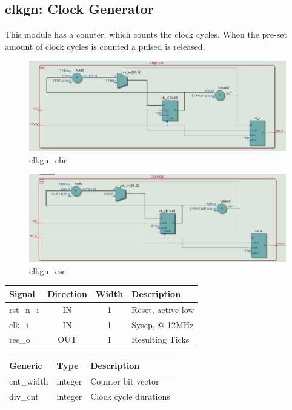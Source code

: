 \documentclass[12pt,a4 paper] {report}
\begin{document}
\subsection{clkgn: Clock Generator}
This module has a counter, which counts the clock cycles. When the pre-set amount of clock cycles is counted a pulsed 
is released.
\begin{figure}[h]
	\centering	
	\includegraphics[scale=0.2]{../png/clkgn_cbr.png}
	\caption{clkgn\_cbr}
\end{figure}
\begin{figure}[h]
	\centering	
	\includegraphics[scale=0.2]{../png/clkgn_csc.png}
	\caption{clkgn\_csc}
\end{figure}
\begin{center}
	\begin{tabular}{ | p{2cm} | c | c | p{5cm} |}
		\hline
		\textbf{Signal} & \textbf{Direction} & \textbf{Width} & \textbf{Description} \\
		\hline	
  	rst\_n\_i & IN & 1 & Reset, active low \\
  	\hline
		clk\_i & IN & 1 & Syscp, @ 12MHz \\
		\hline
		res\_o & OUT & 1 & Resulting Ticks \\
		\hline
	\end{tabular}
\end{center}
\begin{center}
	\begin{tabular}{| p{2cm} | p{2cm} | p{4cm} |}
	\hline
	\textbf{Generic} & \textbf{Type} & \textbf{Description} \\
	\hline
	cnt\_width & integer & Counter bit vector \\
	\hline
	div\_cnt & integer & Clock cycle durations \\	
	\hline
	\end{tabular}
\end{center}
\end{document}
